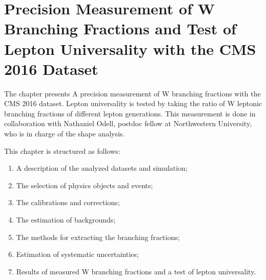 \chapter{Precision Measurement of W Branching Fractions and Test of Lepton Universality with the CMS 2016 Dataset}
\label{sec:analysis}


The chapter presents A precision measurement of W branching fractions with the CMS 2016 dataset. Lepton universality is tested by taking the ratio of W leptonic branching fractions of different lepton generations. This measurement is done in collaboration with Nathaniel Odell, postdoc fellow at Northwestern University, who is in charge of the shape analysis. 


This chapter is structured as follows:

\begin{enumerate}
    \item A description of the analyzed datasets and simulation;
    \item The selection of physics objects and events;
    \item The calibrations and corrections;
    \item The estimation of backgrounds;
    \item The methods for extracting the branching fractions;
    \item Estimation of systematic uncertainties;
    \item Results of measured W branching fractions and a test of lepton universality.
\end{enumerate}
    
    













